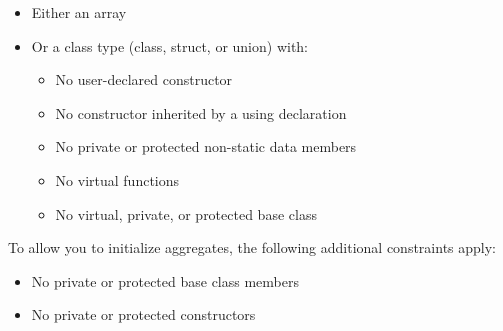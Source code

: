 \begin{itemize}
\item 
Either an array

\item
Or a class type (class, struct, or union) with:

\begin{itemize}
\item 
No user-declared constructor

\item
No constructor inherited by a using declaration

\item
No private or protected non-static data members

\item
No virtual functions

\item
No virtual, private, or protected base class
\end{itemize}

\end{itemize}

To allow you to initialize aggregates, the following additional constraints apply:

\begin{itemize}
\item 
No private or protected base class members

\item 
No private or protected constructors
\end{itemize}











